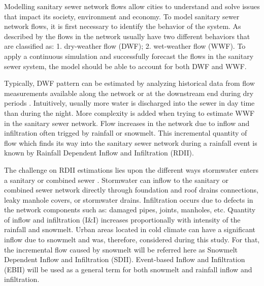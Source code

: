 \label{intro}
Modelling sanitary sewer network flows allow cities to understand and solve issues that impact its society, environment and economy. To model sanitary sewer network flows, it is first necessary to identify the behavior of the system. As described by \citet{Vallabhaneni2007} the flows in the network usually have two different behaviors that are classified as: 1. dry-weather flow (DWF); 2. wet-weather flow (WWF). To apply a continuous simulation and successfully forecast the flows in the sanitary sewer system, the model should be able to account for both DWF and WWF.

Typically, DWF pattern can be estimated by analyzing historical data from flow measurements available along the network or at the downstream end during dry periods \cite{Bennett1999}. Intuitively, usually more water is discharged into the sewer in day time than during the night. More complexity is added when trying to estimate WWF in the sanitary sewer network. Flow increases in the network due to inflow and infiltration often trigged by rainfall or snowmelt. This incremental quantity of flow which finds its way into the sanitary sewer network during a rainfall event is known by Rainfall Dependent Inflow and Infiltration (RDII).

The challenge on RDII estimations lies upon the different ways stormwater enters a sanitary or combined sewer \cite{Mosley2001}. Stormwater can inflow to the sanitary or combined sewer network directly through foundation and roof drains connections, leaky manhole covers, or stormwater drains.  Infiltration occurs due to defects in the network components such as: damaged pipes, joints, manholes, etc. \cite{Rossman2016}
Quantity of inflow and infiltration (I\&I) increases proportionally with intensity of the rainfall and snowmelt. Urban areas located in cold climate can have a significant inflow due to snowmelt and was, therefore, considered during this study. For that, the incremental flow caused by snowmelt will be referred here as Snowmelt Dependent Inflow and Infiltration (SDII). Event-based Inflow and Infiltration (EBII) will be used as a general term for both snowmelt and rainfall inflow and infiltration.


